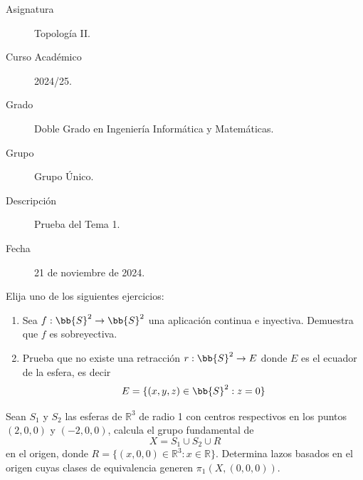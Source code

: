 \documentclass[12pt]{article}
\begin{document}

    
    

    \begin{description}
        \item[Asignatura] Topología II.
        \item[Curso Académico] 2024/25.
        \item[Grado] Doble Grado en Ingeniería Informática y Matemáticas.
        \item[Grupo] Grupo Único.
        \item[Descripción] Prueba del Tema 1.
        \item[Fecha] 21 de noviembre de 2024.
    \end{description}
    \newpage


    
    \begin{ejercicio}
        Elija uno de los siguientes ejercicios:
        \begin{enumerate}[label=\alph*)]
            \item Sea $f:\bb{S}^2\to \bb{S}^2$ una aplicación continua e inyectiva. Demuestra que $f$ es sobreyectiva.
            \item Prueba que no existe una retracción $r:\bb{S}^2\to E$ donde $E$ es el ecuador de la esfera, es decir
                \begin{equation*}
                    E = \{(x,y,z) \in \bb{S}^2 : z=0\}
                \end{equation*}
        \end{enumerate}
    \end{ejercicio}

    \begin{ejercicio}
        Sean $S_1$ y $S_2$ las esferas de $\mathbb{R}^3$ de radio 1 con centros respectivos en los puntos $(2,0,0)$ y $(-2,0,0)$, calcula el grupo fundamental de
        \begin{equation*}
            X = S_1\cup S_2\cup R
        \end{equation*}
        en el origen, donde $R = \{(x,0,0)\in \mathbb{R}^3 : x\in \mathbb{R}\}$. Determina lazos basados en el origen cuyas clases de equivalencia generen $\pi_1(X,(0,0,0))$.
    \end{ejercicio}
\end{document}
